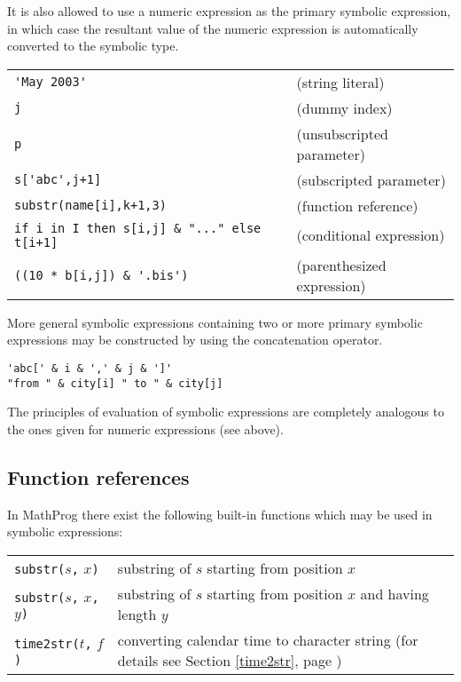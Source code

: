 \documentclass[11pt]{report}
\def\para#1{\noindent{\bf#1}}
\begin{document}
It is also allowed to use a numeric expression as the primary symbolic
expression, in which case the resultant value of the numeric expression
is automatically converted to the symbolic type.

\para{Examples}

\noindent
\begin{tabular}{@{}ll@{}}
\verb|'May 2003'|&(string literal)\\
\verb|j|&(dummy index)\\
\verb|p|&(unsubscripted parameter)\\
\verb|s['abc',j+1]|&(subscripted parameter)\\
\verb|substr(name[i],k+1,3)|&(function reference)\\
\verb|if i in I then s[i,j] & "..." else t[i+1]|
& (conditional expression) \\
\verb|((10 * b[i,j]) & '.bis')|&(parenthesized expression)\\
\end{tabular}

More general symbolic expressions containing two or more primary
symbolic expressions may be constructed by using the concatenation
operator.

\para{Examples}

\begin{verbatim}
'abc[' & i & ',' & j & ']'
"from " & city[i] " to " & city[j]
\end{verbatim}

The principles of evaluation of symbolic expressions are completely
analogous to the ones given for numeric expressions (see above).

\subsection{Function references}

In MathProg there exist the following built-in functions which may be
used in symbolic expressions:

\begin{tabular}{@{}p{112pt}p{328pt}@{}}
{\tt substr(}$s${\tt,} $x${\tt)}&substring of $s$ starting from
position $x$\\
{\tt substr(}$s${\tt,} $x${\tt,} $y${\tt)}&substring of $s$ starting
from position $x$ and having length $y$\\
{\tt time2str(}$t${\tt,} $f${\tt)}&converting calendar time to
character string (for details see Section \ref{time2str}, page
\pageref{time2str})\\
\end{tabular}
\end{document}
